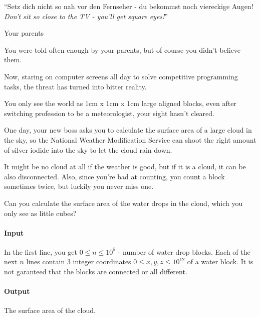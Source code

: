 

\usepackage{epigraph}



\makeheader

\epigraph{``Setz dich nicht so nah vor den Fernseher - du bekommst noch
  viereckige Augen!\\ \textit{Don't sit so close to the TV - you'll get square
    eyes!}''}{Your parents}

You were told often enough by your parents, but of course you didn't believe them.

Now, staring on computer screens all day to solve competitive programming tasks, the threat has turned into bitter reality.

You only see the world as 1cm x 1cm x 1cm large aligned blocks, even after switching profession to be a meteorologist, your sight hasn't cleared.

One day, your new boss asks you to calculate the surface area of a large cloud in the sky, so the National Weather Modification Service can shoot the right amount of silver iodide into the sky to let the cloud rain down.

It might be no cloud at all if the weather is good, but if it is a cloud, it can be also disconnected. Also, since you're bad at counting, you count a block sometimes twice, but luckily you never miss one.

Can you calculate the surface area of the water drops in the cloud, which you only see as little cubes?

\paragraph*{Input}

In the first line, you get $0 \leq n \leq 10^5$ - number of water drop blocks.
Each of the next $n$ lines contain 3 integer coordinates $0 \leq x, y, z \leq 10^{12}$ of a water block. It is not garanteed that the blocks are connected or all different.

\paragraph*{Output}

The surface area of the cloud.

\begin{samples}
\end{samples}

